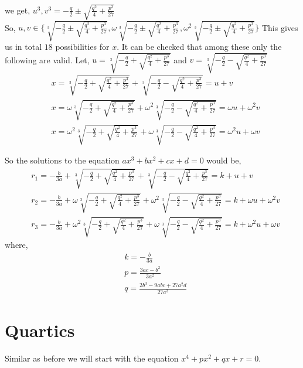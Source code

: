 we get, $u^3,v^3=-\frac{q}{2}\pm\sqrt{\frac{q^2}{4}+\frac{p^3}{27}}$\\
So, $u,v\in\bigg\{\sqrt[3]{-\frac{q}{2}\pm\sqrt{\frac{q^2}{4}+\frac{p^3}{27}}},\omega\sqrt[3]{-\frac{q}{2}\pm\sqrt{\frac{q^2}{4}+\frac{p^3}{27}}},\omega^2\sqrt[3]{-\frac{q}{2}\pm\sqrt{\frac{q^2}{4}+\frac{p^3}{27}}}\bigg\}$
This gives us in total $18$ possibilities for $x$. It can be checked that among these only the following are valid. Let, $u=\sqrt[3]{-\frac{q}{2}+\sqrt{\frac{q^2}{4}+\frac{p^3}{27}}}$ and $v=\sqrt[3]{-\frac{q}{2}-\sqrt{\frac{q^2}{4}+\frac{p^3}{27}}}$
\begin{align*}
&x=\sqrt[3]{-\frac{q}{2}+\sqrt{\frac{q^2}{4}+\frac{p^3}{27}}}+\sqrt[3]{-\frac{q}{2}-\sqrt{\frac{q^2}{4}+\frac{p^3}{27}}}=u+v\\
&x=\omega\sqrt[3]{-\frac{q}{2}+\sqrt{\frac{q^2}{4}+\frac{p^3}{27}}}+\omega^2\sqrt[3]{-\frac{q}{2}-\sqrt{\frac{q^2}{4}+\frac{p^3}{27}}}=\omega u+\omega^2 v\\
&x=\omega^2\sqrt[3]{-\frac{q}{2}+\sqrt{\frac{q^2}{4}+\frac{p^3}{27}}}+\omega\sqrt[3]{-\frac{q}{2}-\sqrt{\frac{q^2}{4}+\frac{p^3}{27}}}=\omega^2 u+\omega v
\end{align*}

So the solutions to the equation $ax^3+bx^2+cx+d=0$ would be,
\begin{align*}
&r_1=-\frac{b}{3a}+\sqrt[3]{-\frac{q}{2}+\sqrt{\frac{q^2}{4}+\frac{p^3}{27}}}+\sqrt[3]{-\frac{q}{2}-\sqrt{\frac{q^2}{4}+\frac{p^3}{27}}}=k+u+v\\
&r_2=-\frac{b}{3a}+\omega\sqrt[3]{-\frac{q}{2}+\sqrt{\frac{q^2}{4}+\frac{p^3}{27}}}+\omega^2\sqrt[3]{-\frac{q}{2}-\sqrt{\frac{q^2}{4}+\frac{p^3}{27}}}=k+\omega u+\omega^2 v\\
&r_3=-\frac{b}{3a}+\omega^2\sqrt[3]{-\frac{q}{2}+\sqrt{\frac{q^2}{4}+\frac{p^3}{27}}}+\omega\sqrt[3]{-\frac{q}{2}-\sqrt{\frac{q^2}{4}+\frac{p^3}{27}}}=k+\omega^2 u+\omega v
\end{align*}
where,
\begin{align*}
&k=-\frac{b}{3a}\\
&p=\frac{3ac-b^2}{3a^2}\\
&q=\frac{2b^3-9abc+27a^2d}{27a^3}
\end{align*} 

\eject

\section{Quartics}

Similar as before we will start with the equation $x^4+px^2+qx+r=0$.\\

